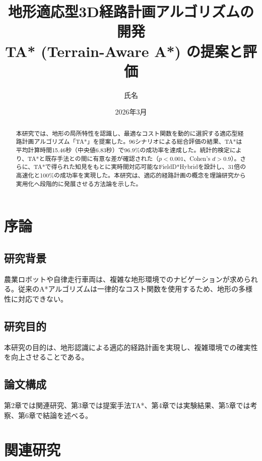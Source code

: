 \documentclass[12pt,a4paper]{article}
\title{地形適応型3D経路計画アルゴリズムの開発\\
       {\large TA* (Terrain-Aware A*) の提案と評価}}
\author{氏名}
\date{2026年3月}
\begin{document}
\maketitle

\begin{abstract}
本研究では、地形の局所特性を認識し、最適なコスト関数を動的に選択する適応型経路計画アルゴリズム「TA*」を提案した。96シナリオによる総合評価の結果、TA*は平均計算時間15.46秒（中央値6.83秒）で96.9\%の成功率を達成した。統計的検定により、TA*と既存手法との間に有意な差が確認された（$p < 0.001$、Cohen's $d > 0.9$）。さらに、TA*で得られた知見をもとに実時間対応可能なFieldD*Hybridを設計し、31倍の高速化と100\%の成功率を実現した。本研究は、適応的経路計画の概念を理論研究から実用化へ段階的に発展させる方法論を示した。
\end{abstract}

\tableofcontents
\newpage

\section{序論}

\subsection{研究背景}

農業ロボットや自律走行車両は、複雑な地形環境でのナビゲーションが求められる。従来のA*アルゴリズム\cite{hart1968}は一律的なコスト関数を使用するため、地形の多様性に対応できない。

\subsection{研究目的}

本研究の目的は、地形認識による適応的経路計画を実現し、複雑環境での確実性を向上させることである。

\subsection{論文構成}

第2章では関連研究、第3章では提案手法TA*、第4章では実験結果、第5章では考察、第6章で結論を述べる。

\section{関連研究}
\end{document}
